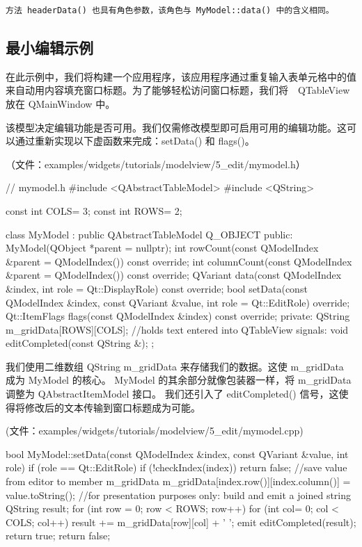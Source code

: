 \begin{lstlisting}
方法 headerData() 也具有角色参数，该角色与 MyModel::data() 中的含义相同。
\end{lstlisting}

\subsection{最小编辑示例}

在此示例中，我们将构建一个应用程序，该应用程序通过重复输入表单元格中的值来自动用内容填充窗口标题。为了能够轻松访问窗口标题，我们将　QTableView 放在 QMainWindow 中。

该模型决定编辑功能是否可用。我们仅需修改模型即可启用可用的编辑功能。这可以通过重新实现以下虚函数来完成：setData() 和 flags()。

（文件：examples/widgets/tutorials/modelview/5\_edit/mymodel.h）


\begin{cppcode}
// mymodel.h
#include <QAbstractTableModel>
#include <QString>

const int COLS= 3;
const int ROWS= 2;

class MyModel : public QAbstractTableModel
{
    Q_OBJECT
public:
    MyModel(QObject *parent = nullptr);
    int rowCount(const QModelIndex &parent = QModelIndex()) const override;
    int columnCount(const QModelIndex &parent = QModelIndex()) const override;
    QVariant data(const QModelIndex &index, int role = Qt::DisplayRole) const override;
    bool setData(const QModelIndex &index, const QVariant &value, int role = Qt::EditRole) override;
    Qt::ItemFlags flags(const QModelIndex &index) const override;
private:
    QString m_gridData[ROWS][COLS];  //holds text entered into QTableView
signals:
    void editCompleted(const QString &);
};
\end{cppcode}

我们使用二维数组 QString m\_gridData 来存储我们的数据。这使 m\_gridData 成为 MyModel 的核心。
MyModel 的其余部分就像包装器一样，将 m\_gridData 调整为 QAbstractItemModel 接口。
我们还引入了 editCompleted() 信号，这使得将修改后的文本传输到窗口标题成为可能。

(文件：examples/widgets/tutorials/modelview/5\_edit/mymodel.cpp)

\begin{cppcode}
bool MyModel::setData(const QModelIndex &index, const QVariant &value, int role)
{
    if (role == Qt::EditRole) {
        if (!checkIndex(index))
            return false;
        //save value from editor to member m_gridData
        m_gridData[index.row()][index.column()] = value.toString();
        //for presentation purposes only: build and emit a joined string
        QString result;
        for (int row = 0; row < ROWS; row++) {
            for (int col= 0; col < COLS; col++)
                result += m_gridData[row][col] + ' ';
        }
        emit editCompleted(result);
        return true;
    }
    return false;
}
\end{cppcode}
    
